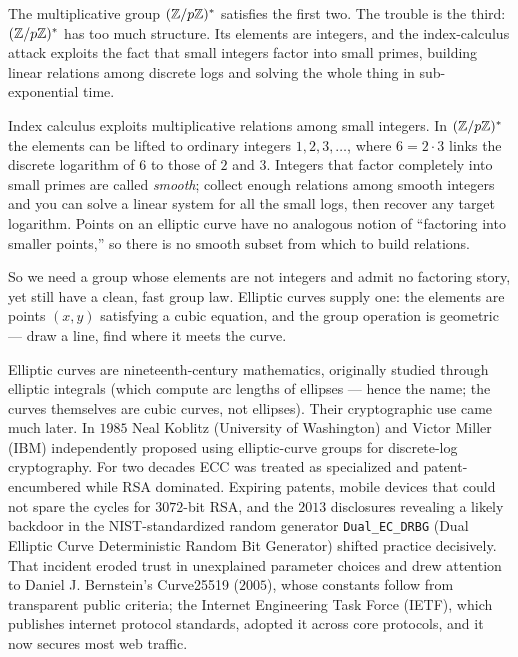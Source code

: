 The multiplicative group $(\mathbb{Z}/p\mathbb{Z})^{*}$ satisfies the first two. The trouble is the third:
$(\mathbb{Z}/p\mathbb{Z})^{*}$ has too much structure. Its elements are integers, and the index-calculus
attack exploits the fact that small integers factor into small primes, building linear
relations among discrete logs and solving the whole thing in sub-exponential time.

\begin{intuitionbox}
Index calculus exploits multiplicative relations among small integers. In $(\mathbb{Z}/p\mathbb{Z})^{*}$ the
elements can be lifted to ordinary integers $1,2,3,\dots$, where $6 = 2\cdot 3$ links
the discrete logarithm of $6$ to those of $2$ and $3$. Integers that factor completely
into small primes are called \emph{smooth}; collect enough relations among smooth integers
and you can solve a linear system for all the small logs, then recover any target
logarithm. Points on an elliptic curve have no analogous notion of ``factoring into
smaller points,'' so there is no smooth subset from which to build relations.
\end{intuitionbox}

So we need a group whose elements are not integers and admit no factoring story, yet
still have a clean, fast group law. Elliptic curves supply one: the elements are points
$(x,y)$ satisfying a cubic equation, and the group operation is geometric --- draw a
line, find where it meets the curve.

\begin{historybox}
Elliptic curves are nineteenth-century mathematics, originally studied through elliptic
integrals (which compute arc lengths of ellipses --- hence the name; the curves
themselves are cubic curves, not ellipses). Their cryptographic use came much later. In
$1985$ Neal Koblitz (University of Washington) and Victor Miller (IBM) independently
proposed using elliptic-curve groups for discrete-log cryptography. For two decades ECC
was treated as specialized and patent-encumbered while RSA dominated. Expiring patents,
mobile devices that could not spare the cycles for $3072$-bit RSA, and the $2013$
disclosures revealing a likely backdoor in the NIST-standardized random generator
\texttt{Dual\_EC\_DRBG} (Dual Elliptic Curve Deterministic Random Bit Generator) shifted
practice decisively. That incident eroded trust in unexplained parameter choices and drew
attention to Daniel J. Bernstein's Curve25519 ($2005$), whose constants follow from transparent
public criteria; the Internet Engineering Task Force (IETF), which publishes internet
protocol standards, adopted it across core protocols, and it now secures most web traffic.
\end{historybox}

